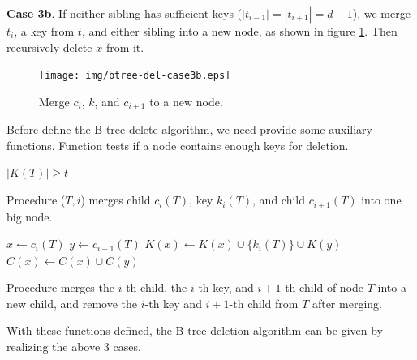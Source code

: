 \documentclass[b5paper]{article}
\begin{document}
\textbf{Case 3b}. If neither sibling has sufficient keys ($|t_{i-1}| = |t_{i+1}| = d - 1$), we merge $t_i$, a key from $t$, and either sibling into a new node, as shown in figure \ref{fig:btree-del-merge-subtree}. Then recursively delete $x$ from it.

\begin{figure}[htbp]
  \centering
  \texttt{[image: img/btree-del-case3b.eps]}
  \caption{Merge $c_i$, $k$, and $c_{i+1}$ to a new node.}
  \label{fig:btree-del-merge-subtree}
\end{figure}

Before define the B-tree delete algorithm, we need provide some auxiliary
functions. Function  tests if a node contains enough keys
for deletion.

\begin{algorithmic}[1]
  \State \Return $|K(T)| \ge t$
\EndFunction
\end{algorithmic}

Procedure ($T, i$) merges child $c_i(T)$, key $k_i(T)$,
and child $c_{i+1}(T)$ into one big node.

\begin{algorithmic}[1]
 
  \State $x \gets c_i(T)$
  \State $y \gets c_{i+1}(T)$
  \State $K(x) \gets K(x) \cup \{k_i(T)\} \cup K(y)$
  \State $C(x) \gets C(x) \cup C(y)$
  \State {}
  \State {}
\EndProcedure
\end{algorithmic}

Procedure  merges the $i$-th child, the $i$-th key,
and $i+1$-th child of node $T$ into a new child, and remove the
$i$-th key and $i+1$-th child from $T$ after merging.

With these functions defined, the B-tree deletion algorithm can be given by
realizing the above 3 cases.
\end{document}
